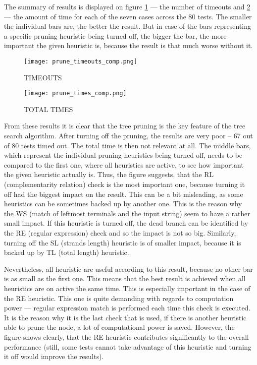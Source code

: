 The summary of results is displayed on figure \ref{fig:prune_timeouts_comp} --- the number of timeouts and \ref{fig:prune_times_comp} --- the amount of time for each of the seven cases across the 80 tests. The smaller the individual bars are, the better the result. But in case of the bars representing a specific pruning heuristic being turned off, the bigger the bar, the more important the given heuristic is, because the result is that much worse without it.

\begin{figure}[h]
  \texttt{[image: prune\_timeouts\_comp.png]}
  \caption{TIMEOUTS}
  \label{fig:prune_timeouts_comp}
\end{figure}

\begin{figure}[h]
  \texttt{[image: prune\_times\_comp.png]}
  \caption{TOTAL TIMES}
  \label{fig:prune_times_comp}
\end{figure}


From these results it is clear that the tree pruning is the key feature of the tree search algorithm. After turning off the pruning, the results are very poor -- 67 out of 80 tests timed out. The total time is then not relevant at all. The middle bars, which represent the individual pruning heuristics being turned off, needs to be compared to the first one, where all heuristics are active, to see how important the given heuristic actually is. Thus, the figure suggests, that the RL (complementarity relation) check is the most important one, because turning it off had the biggest impact on the result. This can be a bit misleading, as some heuristics can be sometimes backed up by another one. This is the reason why the WS (match of leftmost terminals and the input string) seem to have a rather small impact. If this heuristic is turned off, the dead branch can be identified by the RE (regular expression) check and so the impact is not so big. Similarly, turning off the SL (strands length) heuristic is of smaller impact, because it is backed up by TL (total length) heuristic.

Nevertheless, all heuristic are useful according to this result, because no other bar is as small as the first one. This means that the best result is achieved when all heuristics are on active the same time. This is especially important in the case of the RE heuristic. This one is quite demanding with regards to computation power --- regular expression match is performed each time this check is executed. It is the reason why it is the last check that is used, if there is another heuristic able to prune the node, a lot of computational power is saved. However, the figure shows clearly, that the RE heuristic contributes significantly to the overall performance (still, some tests cannot take advantage of this heuristic and turning it off would improve the results).


